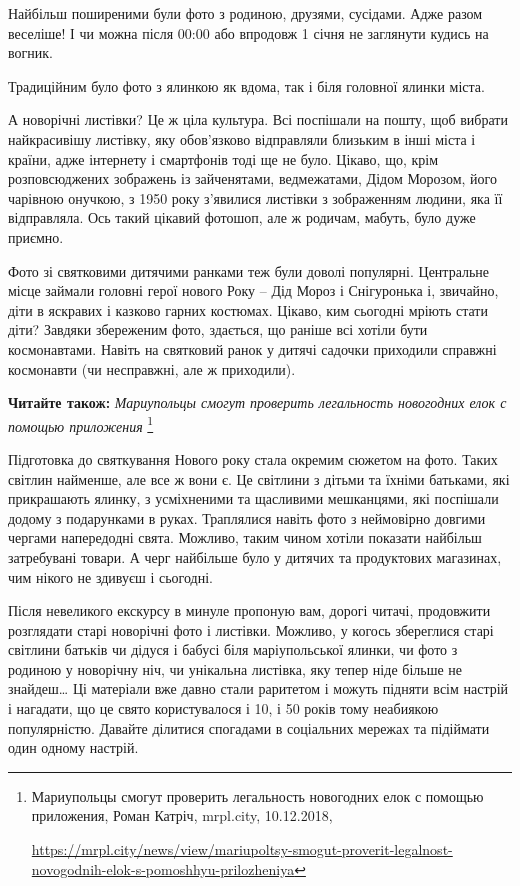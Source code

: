 Найбільш поширеними були фото з родиною, друзями, сусідами. Адже разом
веселіше! І чи можна після 00:00 або впродовж 1 січня не заглянути кудись на
вогник.


Традиційним було фото з ялинкою як вдома, так і біля головної ялинки міста.

А новорічні листівки? Це ж ціла культура. Всі поспішали на пошту, щоб вибрати
найкрасивішу листівку, яку обов'язково відправляли близьким в інші міста і
країни, адже інтернету і смартфонів тоді ще не було. Цікаво, що, крім
розповсюджених зображень із зайченятами, ведмежатами, Дідом Морозом, його
чарівною онучкою, з 1950 року з'явилися листівки з зображенням людини, яка її
відправляла. Ось такий цікавий фотошоп, але ж родичам, мабуть, було дуже
приємно.


Фото зі святковими дитячими ранками теж були доволі популярні. Центральне місце
займали головні герої нового Року – Дід Мороз і Снігуронька і, звичайно, діти в
яскравих і казково гарних костюмах. Цікаво, ким сьогодні мріють стати діти?
Завдяки збереженим фото, здається, що раніше всі хотіли бути космонавтами.
Навіть на святковий ранок у дитячі садочки приходили справжні космонавти (чи
несправжні, але ж приходили).

\textbf{Читайте також:} \emph{Мариупольцы смогут проверить легальность новогодних елок с помощью приложения}%
\footnote{Мариупольцы смогут проверить легальность новогодних елок с помощью приложения, Роман Катріч, mrpl.city, 10.12.2018, \par\url{https://mrpl.city/news/view/mariupoltsy-smogut-proverit-legalnost-novogodnih-elok-s-pomoshhyu-prilozheniya} }

Підготовка до святкування Нового року стала окремим сюжетом на фото. Таких
світлин найменше, але все ж вони є. Це світлини з дітьми та їхніми батьками,
які прикрашають ялинку, з усміхненими та щасливими мешканцями, які поспішали
додому з подарунками в руках. Траплялися навіть фото з неймовірно довгими
чергами напередодні свята. Можливо, таким чином хотіли показати найбільш
затребувані товари. А черг найбільше було у дитячих та продуктових магазинах,
чим нікого не здивуєш і сьогодні.


Після невеликого екскурсу в минуле пропоную вам, дорогі читачі, продовжити
розглядати старі новорічні фото і листівки. Можливо, у когось збереглися старі
світлини батьків чи дідуся і бабусі біля маріупольської ялинки, чи фото з
родиною у новорічну ніч, чи унікальна листівка, яку тепер ніде більше не
знайдеш… Ці матеріали вже давно стали раритетом і можуть підняти всім настрій і
нагадати, що це свято користувалося і 10, і 50 років тому неабиякою
популярністю. Давайте ділитися спогадами в соціальних мережах та підіймати один
одному настрій.

